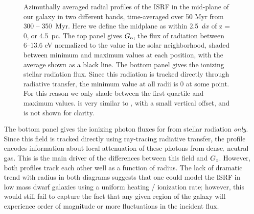 \documentclass[twocolumn]{aastex61}
\begin{document}
\begin{figure}
\caption{
Azimuthally averaged radial profiles of the ISRF in the mid-plane of our galaxy in two different bands, time-averaged over 50 Myr from 300 -- 350~Myr. Here we define the midplane as within 2.5~$dx$ of z = 0, or 4.5~pc. The top panel gives $G_{\rm o}$, the flux of radiation between 6--13.6 eV normalized to the value in the solar neighborhood, shaded between minimum and maximum values at each position, with the average shown as a black line. The bottom panel gives the  ionizing stellar radiation flux. Since this radiation is tracked directly through radiative transfer, the minimum value at all radii is 0 at some point. For this reason we only shade between the first quartile and maximum values.  is very similar to , with a small vertical offset, and is not shown for clarity.}
\label{fig:ISRF}
\end{figure}

The bottom panel gives the ionizing photon fluxes for  from stellar radiation {\em only}. Since this field is tracked directly using ray-tracing radiative transfer, the profile encodes information about local attenuation of these photons from dense, neutral gas. This is the main driver of the differences between this field and $G_{\rm o}$. However, both profiles track each other well as a function of radius. The lack of dramatic trend with radius in both diagrams suggests that one could model the ISRF in low mass dwarf galaxies using a uniform heating / ionization rate; however, this would still fail to capture the fact that any given region of the galaxy will experience order of magnitude or more fluctuations in the incident flux. 
\end{document}
